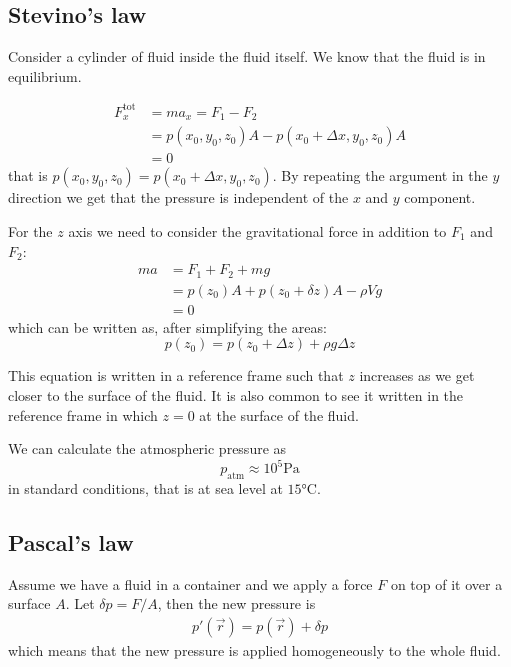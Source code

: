 \documentclass[14pt]{extarticle}
\begin{document}
\subsection{Stevino's law}

Consider a cylinder of fluid inside the fluid itself. We know that the fluid is in equilibrium.

\begin{align}
    F_x^{\text{tot}} & = m a_x = F_1 - F_2                                    \\
                     & = p (x_0, y_0, z_0) A - p (x_0 + \Delta x, y_0, z_0) A \\
                     & = 0
\end{align}
that is $p (x_0, y_0, z_0) = p (x_0 + \Delta x, y_0, z_0)$.
By repeating the argument in the $y$ direction we get that the pressure is independent of the $x$ and $y$ component.

For the $z$ axis we need to consider the gravitational force in addition to $F_1$ and $F_2$:
\begin{align}
    m a & = F_1 + F_2 + m g                           \\
        & = p(z_0) A + p(z_0 + \delta z) A - \rho V g \\
        & = 0
\end{align}
which can be written as, after simplifying the areas:
\begin{equation}
    p(z_0) = p(z_0 + \Delta z) + \rho g \Delta z
\end{equation}

This equation is written in a reference frame such that $z$ increases as we get closer to the surface of the fluid.
It is also common to see it written in the reference frame in which $z = 0$ at the surface of the fluid.

We can calculate the atmospheric pressure as
\begin{equation}
    p_\text{atm} \approx 10^5 \si{\pascal}
\end{equation}
in standard conditions, that is at sea level at $15 \si{\celsius}$.

\subsection{Pascal's law}

Assume we have a fluid in a container and we apply a force $F$ on top of it over a surface $A$.
Let $\delta p = F/A$, then the new pressure is
\begin{eqnarray}
    p'(\vec r) = p (\vec r) + \delta p
\end{eqnarray}
which means that the new pressure is applied homogeneously to the whole fluid.
\end{document}
